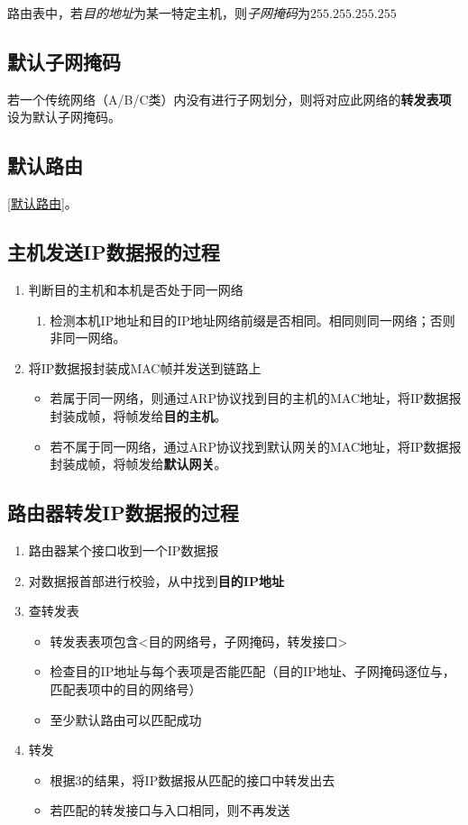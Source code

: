 路由表中，若\textit{目的地址}为某一特定主机，则\textit{子网掩码}为\(255.255.255.255\)


\subsection{默认子网掩码}
若一个传统网络（A/B/C类）内没有进行子网划分，则将对应此网络的\textbf{转发表项}设为默认子网掩码。


\subsection{默认路由}
\ref{默认路由}。


\subsection{主机发送IP数据报的过程}
\begin{enumerate}
    \item 判断目的主机和本机是否处于同一网络\begin{enumerate}
        \item 检测本机IP地址和目的IP地址网络前缀是否相同。相同则同一网络；否则非同一网络。
    \end{enumerate}
    \item 将IP数据报封装成MAC帧并发送到链路上\begin{itemize}
        \item 若属于同一网络，则通过ARP协议找到目的主机的MAC地址，将IP数据报封装成帧，将帧发给\textbf{目的主机}。
        \item 若不属于同一网络，通过ARP协议找到默认网关的MAC地址，将IP数据报封装成帧，将帧发给\textbf{默认网关}。
    \end{itemize}
\end{enumerate}


\subsection{路由器转发IP数据报的过程}
\begin{enumerate}
    \item 路由器某个接口收到一个IP数据报
    \item 对数据报首部进行校验，从中找到\textbf{目的IP地址}
    \item 查转发表\begin{itemize}
        \item 转发表表项包含<目的网络号，子网掩码，转发接口>
        \item 检查目的IP地址与每个表项是否能匹配（目的IP地址、子网掩码逐位与，匹配表项中的目的网络号）
        \item 至少默认路由可以匹配成功
    \end{itemize}
    \item 转发\begin{itemize}
        \item 根据3的结果，将IP数据报从匹配的接口中转发出去
        \item 若匹配的转发接口与入口相同，则不再发送
    \end{itemize}
\end{enumerate}


